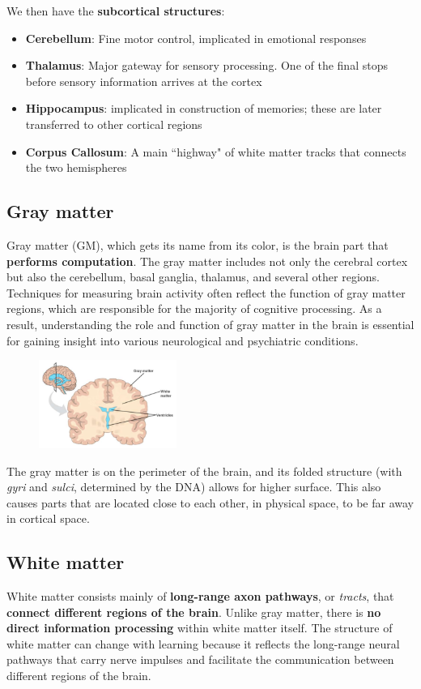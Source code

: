 We then have the \textbf{subcortical structures}:
\begin{itemize}
    \item \textbf{Cerebellum}: Fine motor control, implicated in emotional responses
    \item \textbf{Thalamus}: Major gateway for sensory processing. One of the final stops before sensory information arrives at the cortex
    \item \textbf{Hippocampus}: implicated in construction of memories; these are later transferred to other cortical regions
    \item \textbf{Corpus Callosum}: A main ``highway" of white matter tracks that connects the two hemispheres
\end{itemize}

\subsection{Gray matter}
Gray matter (GM), which gets its name from its color, is the brain part that \textbf{performs computation}. The gray matter includes not only the cerebral cortex but also the cerebellum, basal ganglia, thalamus, and several other regions. Techniques for measuring brain activity often reflect the function of gray matter regions, which are responsible for the majority of cognitive processing. As a result, understanding the role and function of gray matter in the brain is essential for gaining insight into various neurological and psychiatric conditions.

\begin{figure}
  \centering
  \includegraphics[width=0.4\textwidth]{images/brain_2.png}
\end{figure}

The gray matter is on the perimeter of the brain, and its folded structure (with \textit{gyri} and \textit{sulci}, determined by the DNA) allows for higher surface. This also causes parts that are located close to each other, in physical space, to be far away in cortical space.

\subsection{White matter}
White matter consists mainly of \textbf{long-range axon pathways}, or \textit{tracts}, that \textbf{connect different regions of the brain}. Unlike gray matter, there is \textbf{no direct information processing} within white matter itself. The structure of white matter can change with learning because it reflects the long-range neural pathways that carry nerve impulses and facilitate the communication between different regions of the brain. 

